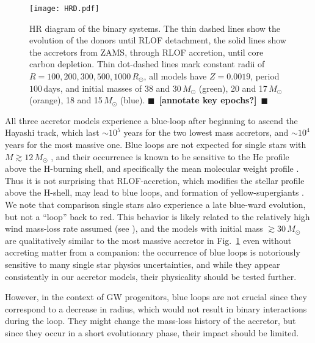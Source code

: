 \documentclass[twocolumn,twocolappendix,trackchanges]{aastex63}
\DeclareRobustCommand{\Figref}[1]{Fig.~\ref{#1}}
\newcommand{\todo}[1]{{\large $\blacksquare$~\textbf{\color{red}[#1]}}~$\blacksquare$}
\begin{document}
\begin{figure}[htbp]
  \texttt{[image: HRD.pdf]}
  \caption{HR diagram of the binary systems. The thin dashed lines
    show the evolution of the donors until RLOF detachment, the solid
    lines show the accretors from ZAMS, through RLOF accretion, until
    core carbon depletion. Thin dot-dashed lines mark constant radii
    of $R=100, 200, 300, 500, 1000\,R_\odot$, all models have
    $Z=0.0019$, period $100$\,days, and initial masses of 38 and
    30\,$M_\odot$ (green), 20 and 17\,$M_\odot$ (orange), 18 and
    15\,$M_\odot$ (blue). \todo{annotate key epochs?}}
  \label{fig:HRD}
\end{figure}

All three accretor models experience a blue-loop after beginning to
ascend the Hayashi track, which last $\sim{}10^5$ years for the two
lowest mass accretors, and $\sim{}10^{4}$ years for the most massive
one. Blue loops are not expected for single stars with
$M\gtrsim 12\,M_\odot$ \citep[e.g.,][]{walmswell:2015}, and their
occurrence is known to be sensitive to the He profile above the
H-burning shell, and specifically the mean molecular weight profile
\citep{walmswell:2015, farrell:22}. Thus it is not surprising that
RLOF-accretion, which modifies the stellar profile above the H-shell,
may lead to blue loops, and formation of yellow-supergiants
\citep[e.g.,][]{dorn-wallenstein:20}. We note that comparison single
stars also experience a late blue-ward evolution, but not a ``loop''
back to red. This behavior is likely related to the relatively high
wind mass-loss rate assumed (see \citealt{renzo:2017}), and the models
with initial mass $\gtrsim 30\,M_\odot$ are qualitatively similar to
the most massive accretor in \Figref{fig:HRD} even without accreting
matter from a companion: the occurrence of blue loops is notoriously
sensitive to many single star physics uncertainties, and while they
appear consistently in our accretor models, their physicality should
be tested further.

However, in the context of GW progenitors, blue loops are not crucial
since they correspond to a decrease in radius, which would not result
in binary interactions during the loop. They might change the
mass-loss history of the accretor, but since they occur in a short
evolutionary phase, their impact should be
limited. %
\end{document}
